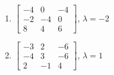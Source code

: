 \begin{exercise}
\begin{enumerate}
\item \(\begin{bmatrix} -4 & 0 & -4
\\-2 & -4 & 0
\\8 & 4 & 6 \end{bmatrix}\), \(\lambda=-2\)

\item \(\begin{bmatrix} -3 & 2 & -6
\\-4 & 3 & -6
\\2 & -1 & 4 \end{bmatrix}\), \(\lambda=1\)

\end{enumerate}
\end{exercise}







